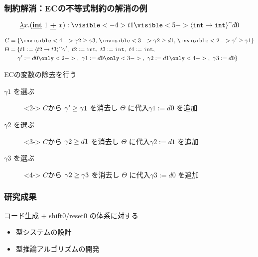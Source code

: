 \begin{frame}
  \frametitle{制約解消：ECの不等式制約の解消の例}
  \[
    \cfun{x}{(\cint{1}~ \cPlus~ x)} : \visible<-4>{t1} \visible<5->{\codeTs{\funT{\intT}{\intT}{}}{d0}}
  \]

  \begin{align*}
    & C = \{\invisible<4->{\longer{\gamma2}{\gamma3},~} \invisible<3->{\longer{\gamma2}{d1},~} \invisible<2->{\longer{\gamma'}{\gamma1}}\} \\
    & \Theta = \{t1 := \codeTs{\funT{t2}{t3}{}}{\gamma'},~ t2 := \intT,~ t3 := \intT,~ t4 := \intT,~\\
    &\phantom{\Theta =~}\gamma' := d0 \only<2->{,~ \gamma1 := d0} \only<3->{,~ \gamma2 := d1} \only<4->{,~ \gamma3 := d0}\}
  \end{align*}

  \begin{exampleblock}{ECの変数の除去を行う}
    \begin{description}
    \item[$\gamma1$ を選ぶ]<2-> $C$から ${\gamma'} \ge {\gamma1}$ を消去し $\Theta$ に代入$\gamma1 := d0$ を追加
    \item[$\gamma2$ を選ぶ]<3-> $C$から ${\gamma2} \ge {d1}$ を消去し $\Theta$ に代入$\gamma2 := d1$ を追加
    \item[$\gamma3$ を選ぶ]<4-> $C$から ${\gamma2} \ge {\gamma3}$ を消去し $\Theta$ に代入$\gamma3 := d0$ を追加
    \end{description}
  \end{exampleblock}

\end{frame}

\begin{frame}
  \frametitle{研究成果}
  \begin{block}{コード生成 + shift0/reset0 の体系に対する}
    \begin{itemize}
    \item 型システムの設計
    \item 型推論アルゴリズムの開発
    \end{itemize}
  \end{block}
\end{frame}

